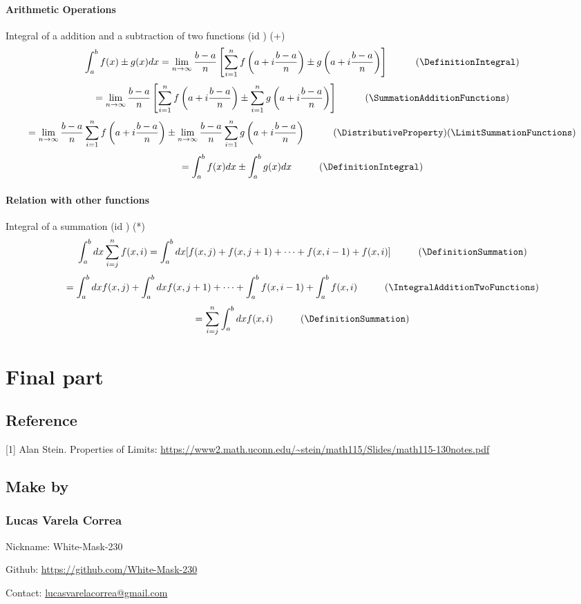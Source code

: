 \documentclass{book}
\begin{document}
                \subsubsection{Arithmetic Operations}
                    Integral of a addition and a subtraction of two functions (id \IntegralAdditionTwoFunctions) (+)
                    \[\int^b_a f(x) \pm g(x) dx = \lim_{n \rightarrow \infty} \frac{b - a}{n} \left[ \sum^n_{i=1} f\left(a + i \frac{b - a}{n}\right) \pm g\left(a + i \frac{b - a}{n} \right) \right] \hspace{1cm} (\DefinitionIntegral)\]
                    \[= \lim_{n \rightarrow \infty} \frac{b - a}{n} \left[\sum^n_{i=1} f\left(a + i \frac{b - a}{n} \right) \pm \sum^n_{i=1} g\left(a + i \frac{b - a}{n}\right) \right] \hspace{1cm} (\SummationAdditionFunctions)\]
                    \[= \lim_{n \rightarrow \infty} \frac{b - a}{n} \sum^n_{i = 1} f\left(a + i \frac{b - a}{n}\right) \pm \lim_{n \rightarrow \infty} \frac{b - a}{n} \sum^n_{i=1} g\left(a + i \frac{b - a}{n}\right) \hspace{1cm} (\DistributiveProperty)(\LimitSummationFunctions)\]
                    \[= \int^b_a f(x) dx \pm \int^b_a g(x) dx \hspace{1cm} (\DefinitionIntegral)\]

                \subsubsection{Relation with other functions}
                    Integral of a summation (id \IntegralSummation) (*)
                    \[\int^b_a dx \sum^n_{i=j} f(x, i) = \int^b_a dx [f(x, j) + f(x, j + 1) + \cdots + f(x, i - 1) + f(x, i)] \hspace{1cm} (\DefinitionSummation)\]
                    \[= \int^b_a dx f(x, j) + \int^b_a dx f(x, j + 1) + \cdots + \int^b_a f(x, i - 1) + \int^b_a f(x, i) \hspace{1cm} (\IntegralAdditionTwoFunctions)\]
                    \[= \sum^n_{i=j} \int^b_a dx f(x, i) \hspace{1cm} (\DefinitionSummation)\]

        \chapter{Final part}
            \section{Reference}
                [1] Alan Stein. Properties of Limits: \url{https://www2.math.uconn.edu/~stein/math115/Slides/math115-130notes.pdf}

            \section{Make by}
                \subsection*{Lucas Varela Correa}
                    Nickname: White-Mask-230
                    
                    Github: \url{https://github.com/White-Mask-230}

                    Contact: \url{lucasvarelacorrea@gmail.com}
\end{document}
